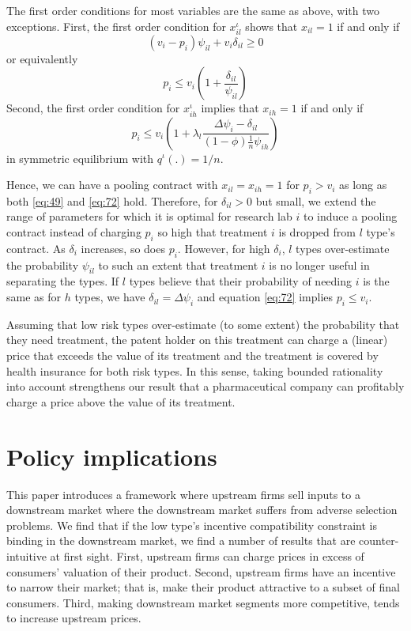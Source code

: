 \documentclass[a4paper,12pt]{article}
\begin{document}
The first order conditions for most variables are the same as above, with two exceptions. First, the first order condition for \(x_{il}^{\iota}\) shows that \(x_{il}=1\) if and only if
\begin{equation}
\label{eq:44}
(v_i-p_i)\psi_{il}+v_i \delta_{il} \geq 0
\end{equation}
or equivalently
\begin{equation}
\label{eq:49}
p_i \leq v_i \left(1+\frac{\delta_{il}}{\psi_{il}} \right)
\end{equation}
Second, the first order condition for \(x_{ih}^{\iota}\) implies that \(x_{ih}=1\) if and only if
\begin{equation}
\label{eq:72}
p_i \leq v_i \left(1+\lambda_l \frac{\Delta \psi_i -\delta_{il}}{(1-\phi)\frac{1}{n} \psi_{ih}} \right)
\end{equation}
in symmetric equilibrium with \(q^{\iota}(.)=1/n\).

Hence, we can have a pooling contract with \(x_{il}=x_{ih}=1\) for \(p_i>v_i\) as long as both \eqref{eq:49} and \eqref{eq:72} hold. Therefore, for \(\delta_{il} > 0\) but small, we extend the range of parameters for which it is optimal for research lab \(i\) to induce a pooling contract instead of charging \(p_i\) so high that treatment \(i\) is dropped from \(l\) type's contract. As \(\delta_i\) increases, so does \(p_i\). However, for high \(\delta_i\), \(l\) types over-estimate the probability \(\psi_{il}\) to such an extent that treatment \(i\) is no longer useful in separating the types. If \(l\) types believe that their probability of needing \(i\) is the same as for \(h\) types, we have \(\delta_{il} = \Delta \psi_i\) and equation \eqref{eq:72} implies \(p_i \leq v_i\).

Assuming that low risk types over-estimate (to some extent) the probability that they need treatment, the patent holder on this treatment can charge a (linear) price that exceeds the value of its treatment and the treatment is covered by health insurance for both risk types. In this sense, taking bounded rationality into account strengthens our result that a pharmaceutical company can profitably charge a price above the value of its treatment.

\section{Policy implications}
\label{sec:org1e9d9a8}

This paper introduces a framework where upstream firms sell inputs to a downstream market where the downstream market suffers from adverse selection problems. We find that if the low type's incentive compatibility constraint is binding in the downstream market, we find a number of results that are counter-intuitive at first sight. First, upstream firms can charge prices in excess of consumers' valuation of their product. Second, upstream firms have an incentive to narrow their market; that is, make their product attractive to a subset of final consumers. Third, making downstream market segments more competitive, tends to increase upstream prices.
\end{document}

